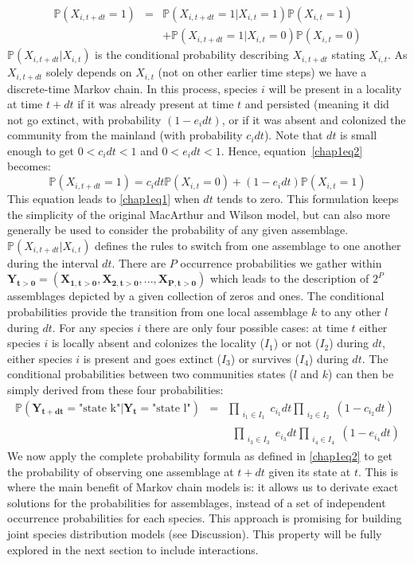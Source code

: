 \begin{eqnarray}
\nonumber \mathbb{P}(X_{i,t+dt}=1) &=& \mathbb{P}(X_{i,t+dt}=1|X_{i,t}=1)\mathbb{P}(X_{i,t}=1) \\
\label{chap1eq2} & & +\mathbb{P}(X_{i,t+dt}=1|X_{i,t}=0)\mathbb{P}(X_{i,t}=0)
\end{eqnarray}
$\mathbb{P}(X_{i,t+dt}|X_{i,t})$ is the conditional probability describing $X_{i,t+dt}$ stating $X_{i,t}$. As $X_{i,t+dt}$ solely depends on $X_{i,t}$ (not on other earlier time steps) we have a discrete-time Markov chain. In this process, species $i$ will be present in a locality at time $t+dt$ if it was already present at time $t$ and persisted (meaning it did not go extinct, with probability $(1-e_idt)$, or if it was absent and colonized the community from the mainland (with probability $c_idt$). Note that $dt$ is small enough to get $0<c_idt<1$ and $0<e_idt<1$. Hence, equation~\eqref{chap1eq2} becomes:
\begin{equation}
\label{chap1eq3} \mathbb{P}(X_{i,t+dt}=1)=c_idt\mathbb{P}(X_{i,t}=0)+(1-e_idt)\mathbb{P}(X_{i,t}=1)
\end{equation}
This equation leads to \eqref{chap1eq1} when $dt$ tends to zero. This formulation keeps the simplicity of the original MacArthur and Wilson model, but can also more generally be used to consider the probability of any given assemblage. $\mathbb{P}(X_{i,t+dt}|X_{i,t})$ defines the rules to switch from one assemblage to one another during the interval $dt$.
There are $P$ occurrence probabilities we gather within $\mathbf{Y_{t>0}}=(\mathbf{X_{1,t>0}}, \mathbf{X_{2,t>0}}, ..., \mathbf{X_{P,t>0}})$ which leads to the description of $2^P$ assemblages depicted by a given collection of zeros and ones.
The conditional probabilities provide the transition from one local assemblage $k$ to any other $l$ during $dt$. For any species $i$ there are only four possible cases: at time $t$ either species $i$ is locally absent and colonizes the locality ($I_1$) or not ($I_2$) during $dt$, either species $i$ is present and goes extinct ($I_3$) or survives ($I_4$) during $dt$. The conditional probabilities between two communities states ($l$ and $k$) can then be simply derived from these four probabilities:
\begin{eqnarray}
 \nonumber \mathbb{P}(\mathbf{Y_{t+dt}}=\text{"state k"}| \mathbf{Y_{t}}=\text{"state l"}) &=& \prod_{\substack{i_1\in I_1}}c_{i_1}dt\prod_{\substack{i_2\in I_2}}(1-c_{i_2}dt)
\\  \label{chap1eq4} & &~~\prod_{\substack{i_3\in I_3}}e_{i_3}dt\prod_{\substack{i_4\in I_4}}(1-e_{i_4}dt)
\end{eqnarray}
We now apply the complete probability formula as defined in \eqref{chap1eq2} to get the probability of observing one assemblage at $t+dt$ given its state at $t$. This is where the main benefit of Markov chain models is: it allows us to derivate exact solutions for the probabilities for assemblages, instead of a set of independent occurrence probabilities for each species. This approach is promising for building joint species distribution models (see Discussion). This property will be fully explored in the next section to include interactions.

